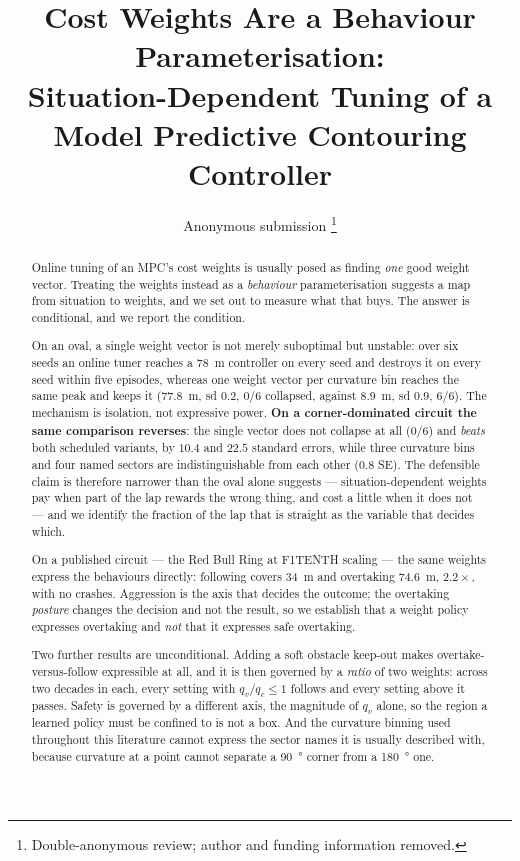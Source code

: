 \documentclass[letterpaper, 10 pt, conference]{ieeeconf}
\title{\LARGE\bf Cost Weights Are a Behaviour Parameterisation:\\
Situation-Dependent Tuning of a Model Predictive Contouring Controller}
\author{Anonymous submission%
\thanks{Double-anonymous review; author and funding information removed.}}
\begin{document}
\maketitle
\thispagestyle{empty}
\pagestyle{empty}

\begin{abstract}
Online tuning of an MPC's cost weights is usually posed as finding \emph{one}
good weight vector. Treating the weights instead as a \emph{behaviour}
parameterisation suggests a map from situation to weights, and we set out to
measure what that buys. The answer is conditional, and we report the condition.

On an oval, a single weight vector is not merely suboptimal but unstable: over
six seeds an online tuner reaches a \SI{78}{\meter} controller on every seed and
destroys it on every seed within five episodes, whereas one weight vector per
curvature bin reaches the same peak and keeps it (\SI{77.8}{\meter}, sd $0.2$,
$0/6$ collapsed, against \SI{8.9}{\meter}, sd $0.9$, $6/6$). The mechanism is
isolation, not expressive power. \textbf{On a corner-dominated circuit the same
comparison reverses}: the single vector does not collapse at all ($0/6$) and
\emph{beats} both scheduled variants, by $10.4$ and $22.5$ standard errors,
while three curvature bins and four named sectors are indistinguishable from
each other ($0.8$ SE). The defensible claim is therefore narrower than the
oval alone suggests --- situation-dependent weights pay when part of the lap
rewards the wrong thing, and cost a little when it does not --- and we identify
the fraction of the lap that is straight as the variable that decides which.

On a published circuit --- the Red Bull Ring at F1TENTH scaling --- the same
weights express the behaviours directly: following covers \SI{34}{\meter} and
overtaking \SI{74.6}{\meter}, $2.2\times$, with no crashes. Aggression is the
axis that decides the outcome; the overtaking \emph{posture} changes the
decision and not the result, so we establish that a weight policy expresses
overtaking and \emph{not} that it expresses safe overtaking.

Two further results are unconditional. Adding a soft obstacle keep-out makes
overtake-versus-follow expressible at all, and it is then governed by a
\emph{ratio} of two weights: across two decades in each, every setting with
$q_v/q_c \le 1$ follows and every setting above it passes. Safety is governed by
a different axis, the magnitude of $q_v$ alone, so the region a learned policy
must be confined to is not a box. And the curvature binning used throughout this
literature cannot express the sector names it is usually described with, because
curvature at a point cannot separate a \SI{90}{\degree} corner from a
\SI{180}{\degree} one.
\end{abstract}
\end{document}

